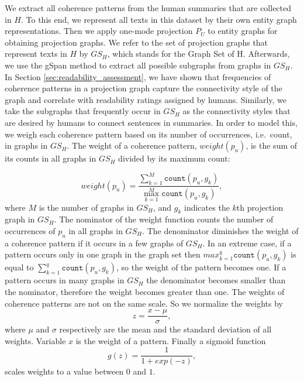 We extract all coherence patterns from the human summaries that are collected in $H$. 
To this end, we represent all texts in this dataset by their own entity graph representations. 
Then we apply one-mode projection $P_U$ to entity graphs for obtaining projection graphs. 
We refer to the set of projection graphs that represent texts in $H$ by $GS_H$, which stands for the Graph Set of H. 
Afterwards, we use the gSpan method to extract all possible subgraphs from  graphs in $GS_H$. 
In Section \ref{sec:readability_assessment}, we have shown that frequencies of coherence patterns in a projection graph capture the connectivity style of the graph and correlate with readability ratings assigned by humans.  
Similarly, we take the subgraphs that frequently occur in $GS_H$ as the connectivity styles that are desired by humans to connect sentences in summaries. 
In order to model this, we weigh each coherence pattern based on its number of occurrences, i.e.\ count, in graphs in $GS_H$.  
The weight of a coherence pattern, $weight(p_u)$, is the sum of its counts in all graphs in $GS_H$ divided by its maximum count:

\begin{equation}
weight(p_u) = \frac{\sum_{k=1}^{M}{\mathtt{count}(p_u,g_k)}}{\max_{k=1}^{M}{\mathtt{count}(p_u,g_k)}},
\end{equation}
where $M$ is the number of graphs in $GS_H$, and $g_k$ indicates the $k$th projection graph in $GS_H$.
The nominator of the weight function counts the number of occurrences of $p_u$ in all graphs in $GS_H$. 
The denominator diminishes the weight of a coherence pattern if it  occurs in a few graphs of $GS_H$. 
In an extreme case, if a pattern occurs only in one graph in the graph set then $max_{k=1}^{q}{\mathtt{count}(p_u,g_k)}$ is equal to $\sum_{k=1}^{q}{\mathtt{count}(p_u,g_k)}$, so the weight of the pattern becomes one. 
If a pattern occurs in many graphs in $GS_H$ the denominator becomes smaller than the nominator, therefore the weight becomes greater than one. 
The weights of coherence patterns are not on the same scale.  
So we normalize the weights by 
\begin{equation}
z = \frac{x-\mu}{\sigma},
\end{equation}
where $\mu$ and $\sigma$ respectively are the mean and the standard deviation of all weights. Variable $x$ is the weight of a pattern.   
Finally a sigmoid function
\begin{equation}
 g(z) = \frac{1}{1+exp(-z)},
\end{equation}
scales weights to a value between $0$ and $1$. 

